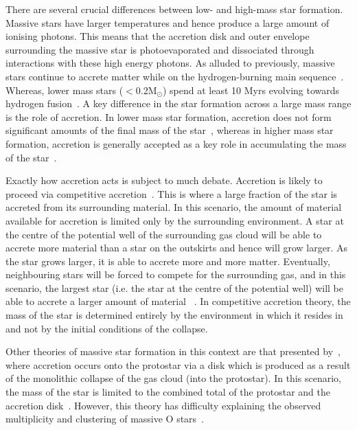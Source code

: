 \documentclass[a4paper,12pt]{article}
\begin{document}
There are several crucial differences between low- and high-mass star formation.\footnotemark~
Massive stars have larger temperatures and hence produce a large amount of ionising photons. 
This means that the accretion disk and outer envelope surrounding the massive star is photoevaporated and dissociated through interactions with these high energy photons.
As alluded to previously, massive stars continue to accrete matter while on the hydrogen-burning main sequence~\citep{Zinnecker07}. 
Whereas, lower mass stars ($ < $0.2M$_{\odot}$) spend at least 10 Myrs evolving towards hydrogen fusion~\citep{Luhman12}.
A key difference in the star formation across a large mass range is the role of accretion. 
In lower mass star formation, accretion does not form significant amounts of the final mass of the star~\citep{Bonnell08}, whereas in higher mass star formation, accretion is generally accepted as a key role in accumulating the mass of the star~\citep{Kraus10}. 


Exactly how accretion acts is subject to much debate. 
Accretion is likely to proceed via competitive accretion~\citep{Bonnell01}. 
This is where a large fraction of the star is accreted from its surrounding material. 
In this scenario, the amount of material available for accretion is limited only by the surrounding environment. 
A star at the centre of the potential well of the surrounding gas cloud will be able to accrete more material than a star on the outskirts and hence will grow larger. 
As the star grows larger, it is able to accrete more and more matter.
Eventually, neighbouring stars will be forced to compete for the surrounding gas, and in this scenario, the largest star (i.e. the star at the centre of the potential well) will be able to accrete a larger amount of material ~\citep[for a useful economical analogy, see Section 4.2 of][]{Zinnecker07}.
In competitive accretion theory, the mass of the star is determined entirely by the environment in which it resides in and not by the initial conditions of the collapse.

Other theories of massive star formation in this context are that presented by~\cite{Yorke02}, where accretion occurs onto the protostar via a disk which is produced as a result of the monolithic collapse of the gas cloud (into the protostar). 
In this scenario, the mass of the star is limited to the combined total of the protostar and the accretion disk~\citep{Zinnecker07}.
However, this theory has difficulty explaining the observed multiplicity and clustering of massive O stars~\citep{Zinnecker07, Sana12, Kennicutt12}.
\end{document}
